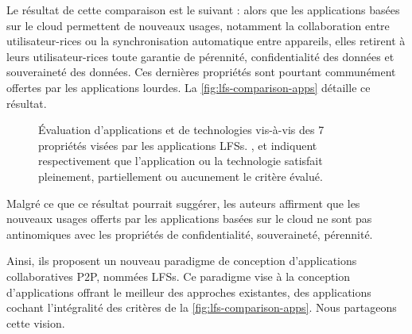 Le résultat de cette comparaison est le suivant : alors que les applications basées sur le cloud permettent de nouveaux usages, notamment la collaboration entre utilisateur-rices ou la synchronisation automatique entre appareils, elles retirent à leurs utilisateur-rices toute garantie de pérennité, confidentialité des données et souveraineté des données.
Ces dernières propriétés sont pourtant communément offertes par les applications lourdes.
La \autoref{fig:lfs-comparison-apps} détaille ce résultat.

\begin{figure}[!ht]
  \centering
  \caption[Caption for lfs-comparison-apps]{
    Évaluation d'applications et de technologies vis-à-vis des 7 propriétés visées par les applications \aclp{LFS}\footnotemark.
    {\color{lfsgreen} \checked}, {\color{lfsorange} \Flatsteel} et {\scriptsize \color{lfsred} } indiquent respectivement que l'application ou la technologie satisfait pleinement, partiellement ou aucunement le critère évalué.
  }
  \label{fig:lfs-comparison-apps}
\end{figure}

Malgré ce que ce résultat pourrait suggérer, les auteurs affirment que les nouveaux usages offerts par les applications basées sur le cloud ne sont pas antinomiques avec les propriétés de confidentialité, souveraineté, pérennité.

Ainsi, ils proposent un nouveau paradigme de conception d'applications collaboratives \ac{P2P}, nommées \acp{LFS}.
Ce paradigme vise à la conception d'applications offrant le meilleur des approches existantes, \ie des applications cochant l'intégralité des critères de la \autoref{fig:lfs-comparison-apps}.
Nous partageons cette vision.\\

